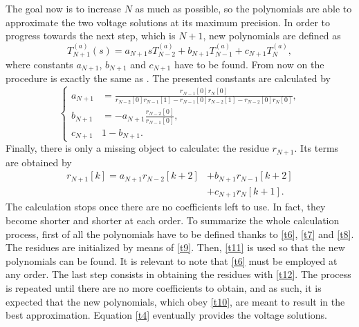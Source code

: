 \documentclass[conference]{IEEEtran}
\begin{document}
The goal now is to increase $N$ as much as possible, so the polynomials are able to approximate the two voltage solutions at its maximum precision. In order to progress towards the next step, which is $N+1$, new polynomials are defined as
\begin{equation}
  T^{(a)}_{N+1}(s)=a_{N+1}sT^{(a)}_{N-2}+b_{N+1}T^{(a)}_{N-1}+c_{N+1}T^{(a)}_N,
  \label{t10}
\end{equation}
where constants $a_{N+1}$, $b_{N+1}$ and $c_{N+1}$ have to be found. From now on the procedure is exactly the same as \cite{Trias2018}. The presented constants are calculated by
\begin{equation}
  \begin{cases}
    a_{N+1}&=\frac{r_{N-1}[0]r_N[0]}{r_{N-2}[0]r_{N-1}[1]-r_{N-1}[0]r_{N-2}[1]-r_{N-2}[0]r_N[0]},\\
    b_{N+1}&=-a_{N+1}\frac{r_{N-2}[0]}{r_{N-1}[0]},\\
    c_{N+1}&1-b_{N+1}.
  \end{cases}
  \label{t11}
\end{equation}
Finally, there is only a missing object to calculate: the residue $r_{N+1}$. Its terms are obtained by
\begin{equation}
  \begin{split}
    r_{N+1}[k]=a_{N+1}r_{N-2}[k+2]&+b_{N+1}r_{N-1}[k+2]\\
    &+c_{N+1}r_N[k+1].
  \end{split}
  \label{t12}
\end{equation}
The calculation stops once there are no coefficients left to use. In fact, they become shorter and shorter at each order. To summarize the whole calculation process, first of all the polynomials have to be defined thanks to \eqref{t6}, \eqref{t7} and \eqref{t8}. The residues are initialized by means of \eqref{t9}. Then, \eqref{t11} is used so that the new polynomials can be found. It is relevant to note that \eqref{t6} must be employed at any order. The last step consists in obtaining the residues with \eqref{t12}. The process is repeated until there are no more coefficients to obtain, and as such, it is expected that the new polynomials, which obey \eqref{t10}, are meant to result in the best approximation. Equation \eqref{t4} eventually provides the voltage solutions.
\end{document}
